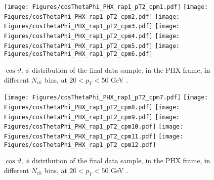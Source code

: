 \documentclass[12pt]{article}
\begin{document}
\begin{figure}[htbp]
\centering
\texttt{[image: Figures/cosThetaPhi\_PHX\_rap1\_pT2\_cpm1.pdf]}
\texttt{[image: Figures/cosThetaPhi\_PHX\_rap1\_pT2\_cpm2.pdf]}
\texttt{[image: Figures/cosThetaPhi\_PHX\_rap1\_pT2\_cpm3.pdf]}
\texttt{[image: Figures/cosThetaPhi\_PHX\_rap1\_pT2\_cpm4.pdf]}
\texttt{[image: Figures/cosThetaPhi\_PHX\_rap1\_pT2\_cpm5.pdf]}
\texttt{[image: Figures/cosThetaPhi\_PHX\_rap1\_pT2\_cpm6.pdf]}
\caption{$\cos\vartheta,\,\phi$ distribution of the final data sample, 
	in the PHX frame, in different $N_{ch}$ bins, at $20 < p_{T} < 50$ GeV .}
\end{figure}
\clearpage

\begin{figure}[htbp]
\centering
\texttt{[image: Figures/cosThetaPhi\_PHX\_rap1\_pT2\_cpm7.pdf]}
\texttt{[image: Figures/cosThetaPhi\_PHX\_rap1\_pT2\_cpm8.pdf]}
\texttt{[image: Figures/cosThetaPhi\_PHX\_rap1\_pT2\_cpm9.pdf]}
\texttt{[image: Figures/cosThetaPhi\_PHX\_rap1\_pT2\_cpm10.pdf]}
\texttt{[image: Figures/cosThetaPhi\_PHX\_rap1\_pT2\_cpm11.pdf]}
\texttt{[image: Figures/cosThetaPhi\_PHX\_rap1\_pT2\_cpm12.pdf]}
\caption{$\cos\vartheta,\,\phi$ distribution of the final data sample, 
	in the PHX frame, in different $N_{ch}$ bins, at $20 < p_{T} < 50$ GeV .}
\end{figure}
\clearpage
\end{document}

